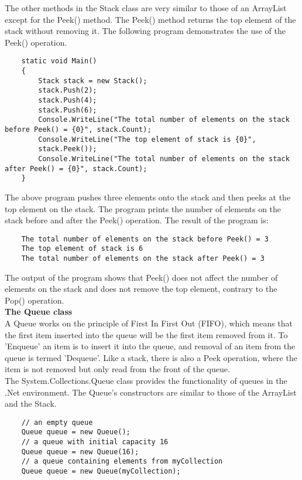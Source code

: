 The other methods in the Stack class are very similar to those of an ArrayList except for the Peek() method. The
Peek() method returns the top element of the stack without removing it. The following program demonstrates the
use of the Peek() operation.

\begin{lstlisting}
    static void Main()
    {
        Stack stack = new Stack();
        stack.Push(2);
        stack.Push(4);
        stack.Push(6);
        Console.WriteLine("The total number of elements on the stack before Peek() = {0}", stack.Count);
        Console.WriteLine("The top element of stack is {0}",
        stack.Peek());
        Console.WriteLine("The total number of elements on the stack after Peek() = {0}", stack.Count);
    }    
\end{lstlisting}

The above program pushes three elements onto the stack and then peeks at the top element on the stack. The
program prints the number of elements on the stack before and after the Peek() operation. The result of the program
is:

\begin{lstlisting}
    The total number of elements on the stack before Peek() = 3
    The top element of stack is 6
    The total number of elements on the stack after Peek() = 3    
\end{lstlisting}

The output of the program shows that Peek() does not affect the number of elements on the stack and does not
remove the top element, contrary to the Pop() operation.\\

\textbf{The Queue class}\\

A Queue works on the principle of First In First Out (FIFO), which means that the first item inserted into the queue
will be the first item removed from it. To ’Enqueue’ an item is to insert it into the queue, and removal of an item
from the queue is termed ’Dequeue’. Like a stack, there is also a Peek operation, where the item is not removed but
only read from the front of the queue.\\

The System.Collections.Queue class provides the functionality of queues in the .Net environment. The Queue’s
constructors are similar to those of the ArrayList and the Stack.

\begin{lstlisting}
    // an empty queue
    Queue queue = new Queue();
    // a queue with initial capacity 16
    Queue queue = new Queue(16);
    // a queue containing elements from myCollection
    Queue queue = new Queue(myCollection);    
\end{lstlisting}

